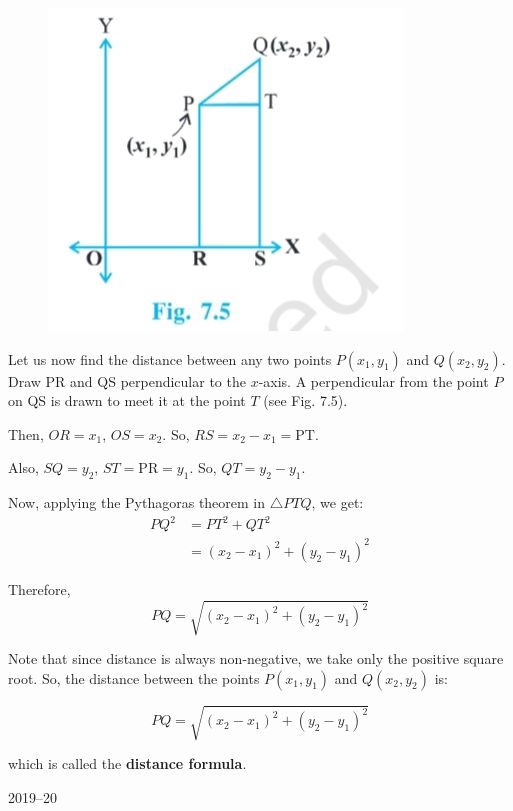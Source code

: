 \documentclass[11pt]{article}
\begin{document}
\vspace{0.5em}

\begin{figure}
    \centering
    \vspace{-1em}
    \includegraphics[width=0.95\linewidth]{sum.png}
    \vspace{-1em}
\end{figure}

\hspace{2em} Let us now find the distance between any two points \(P(x_1, y_1)\) and \(Q(x_2, y_2)\). Draw PR and QS perpendicular to the \(x\)-axis. A perpendicular from the point \(P\) on QS is drawn to meet it at the point \(T\) (see Fig. 7.5).

Then, \(OR = x_1\), \(OS = x_2\). So, \(RS = x_2 - x_1 = \text{PT}\).

Also, \(SQ = y_2\), \(ST = \text{PR} = y_1\). So, \(QT = y_2 - y_1\).

Now, applying the Pythagoras theorem in \(\triangle PTQ\), we get:
\[
\begin{aligned}
PQ^2 &= PT^2 + QT^2 \\
     &= (x_2 - x_1)^2 + (y_2 - y_1)^2
\end{aligned}
\]

Therefore,
\[
PQ = \sqrt{(x_2 - x_1)^2 + (y_2 - y_1)^2}
\]

Note that since distance is always non-negative, we take only the positive square root. So, the distance between the points \(P(x_1, y_1)\) and \(Q(x_2, y_2)\) is:

{\boldmath
\[
PQ = \sqrt{(x_2 - x_1)^2 + (y_2 - y_1)^2}
\]
}

which is called the \textbf{distance formula}.

\vspace{33em}
\begin{center}
    2019--20
\end{center}
\end{document}
